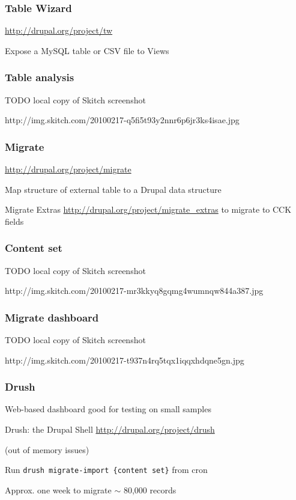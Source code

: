 \documentclass[ignorenonframetext,11pt]{beamer}
\begin{document}
\begin{frame}
\frametitle{Table Wizard}
\label{tablewizard}

\url{http://drupal.org/project/tw}


Expose a MySQL table or CSV file to Views



\end{frame}
		

\begin{frame}
\frametitle{Table analysis}
\label{tableanalysis}

TODO local copy of Skitch screenshot


http://img.skitch.com/20100217-q5fi5t93y2nnr6p6jr3ks4isae.jpg



\end{frame}
		

\begin{frame}
\frametitle{Migrate}
\label{migrate}

\url{http://drupal.org/project/migrate}


Map structure of external table to a Drupal data structure


Migrate Extras \url{http://drupal.org/project/migrate\_extras} to migrate to CCK fields



\end{frame}
		

\begin{frame}
\frametitle{Content set}
\label{contentset}

TODO local copy of Skitch screenshot


http://img.skitch.com/20100217-mr3kkyq8gqmg4wumnqw844a387.jpg



\end{frame}
		

\begin{frame}
\frametitle{Migrate dashboard}
\label{migratedashboard}

TODO local copy of Skitch screenshot


http://img.skitch.com/20100217-t937n4rq5tqx1iqqxhdqne5gn.jpg



\end{frame}
		

\begin{frame}
\frametitle{Drush}
\label{drush}

Web-based dashboard good for testing on small samples


Drush: the Drupal Shell \url{http://drupal.org/project/drush}


(out of memory issues)


Run \texttt{drush migrate-import \{content set\}} from cron


Approx. one week to migrate \ensuremath{\sim} 80,000 records



\end{frame}
		
\end{document}
